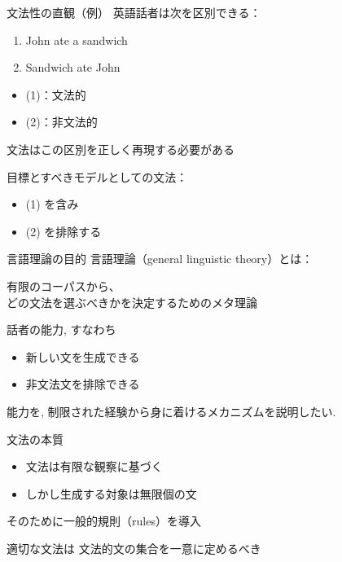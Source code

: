 \documentclass[dvipdfmx, xcolor={dvipsnames},12pt]{beamer}
\begin{document}
\begin{frame}{文法性の直観（例）}
英語話者は次を区別できる：

\begin{enumerate}
\item[(1)] John ate a sandwich
\item[(2)] Sandwich ate John
\end{enumerate}

\begin{itemize}
    \item (1)：文法的
    \item (2)：非文法的
\end{itemize}
文法はこの区別を正しく再現する必要がある

目標とすべきモデルとしての文法：
\begin{itemize}
    \item (1) を含み
    \item (2) を排除する
\end{itemize}
\end{frame}

\begin{frame}{言語理論の目的}
言語理論（general linguistic theory）とは：

\begin{block}{}
有限のコーパスから、\\
どの文法を選ぶべきかを決定するためのメタ理論
\end{block}

話者の能力, すなわち
    \begin{itemize}
        \item 新しい文を生成できる
        \item 非文法文を排除できる
    \end{itemize}
能力を, 制限された経験から身に着けるメカニズムを説明したい.
\end{frame}

\begin{frame}{文法の本質}
\begin{itemize}
    \item 文法は有限な観察に基づく
    \item しかし生成する対象は無限個の文
\end{itemize}
そのために一般的規則（rules）を導入


適切な文法は
文法的文の集合を一意に定めるべき
\end{frame}
\end{document}
